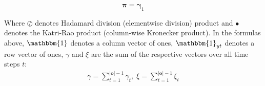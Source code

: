 \begin{equation}
    \boldsymbol{\pi} = \boldsymbol{\gamma}_1
    \label{eq:equation27}
\end{equation}

Where $\oslash$ denotes Hadamard division (elementwise division) product and $\bullet$ denotes the Katri-Rao product (column-wise Kronecker product).
In the formulas above, $\mathbbm{1}$ denotes a column vector of ones, $\mathbbm{1}_{yt}$ denotes a row vector of ones, $\gamma$ and $\xi$ are the sum of the respective vectors over all time steps $t$:
\begin{align}
    \gamma = \sum_{t=1}^{|\mathbf{o}|-1} \gamma_t, \;
    \xi = \sum_{t=1}^{|\mathbf{o}|-1} \xi_t
\end{align} 

